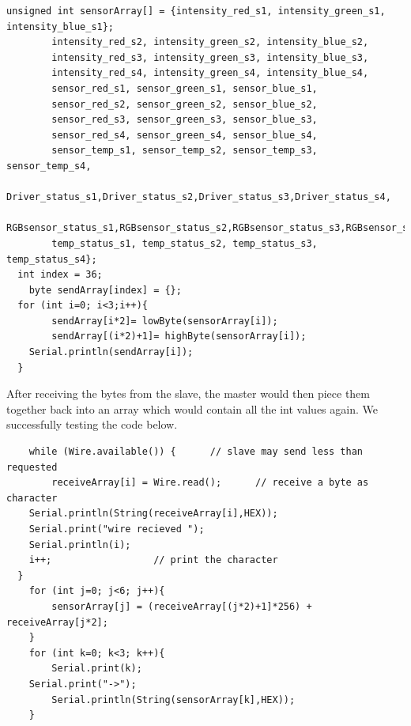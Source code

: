 \documentclass[12pt,a4paper]{report}
\begin{document}
\begin{lstlisting}
unsigned int sensorArray[] = {intensity_red_s1, intensity_green_s1, intensity_blue_s1};
		intensity_red_s2, intensity_green_s2, intensity_blue_s2,
		intensity_red_s3, intensity_green_s3, intensity_blue_s3,
		intensity_red_s4, intensity_green_s4, intensity_blue_s4,
		sensor_red_s1, sensor_green_s1, sensor_blue_s1,
		sensor_red_s2, sensor_green_s2, sensor_blue_s2,
		sensor_red_s3, sensor_green_s3, sensor_blue_s3,
		sensor_red_s4, sensor_green_s4, sensor_blue_s4,
		sensor_temp_s1, sensor_temp_s2, sensor_temp_s3, sensor_temp_s4,
		Driver_status_s1,Driver_status_s2,Driver_status_s3,Driver_status_s4,
		RGBsensor_status_s1,RGBsensor_status_s2,RGBsensor_status_s3,RGBsensor_status_s4,
		temp_status_s1, temp_status_s2, temp_status_s3, temp_status_s4};
  int index = 36;
	byte sendArray[index] = {};
  for (int i=0; i<3;i++){
		sendArray[i*2]= lowByte(sensorArray[i]);
		sendArray[(i*2)+1]= highByte(sensorArray[i]);
    Serial.println(sendArray[i]);
  }
\end{lstlisting}

After receiving the bytes from the slave, the master would then piece them together back into an array which would contain all the int values again. We successfully testing the code below.

\begin{lstlisting}
	while (Wire.available()) { 		// slave may send less than requested
		receiveArray[i] = Wire.read(); 		// receive a byte as character
    Serial.println(String(receiveArray[i],HEX));
    Serial.print("wire recieved ");
    Serial.println(i);
    i++;                  // print the character
  }
	for (int j=0; j<6; j++){
		sensorArray[j] = (receiveArray[(j*2)+1]*256) + receiveArray[j*2];
	}
	for (int k=0; k<3; k++){
		Serial.print(k);
    Serial.print("->");
		Serial.println(String(sensorArray[k],HEX));
	}
\end{lstlisting}
%
\end{document}
